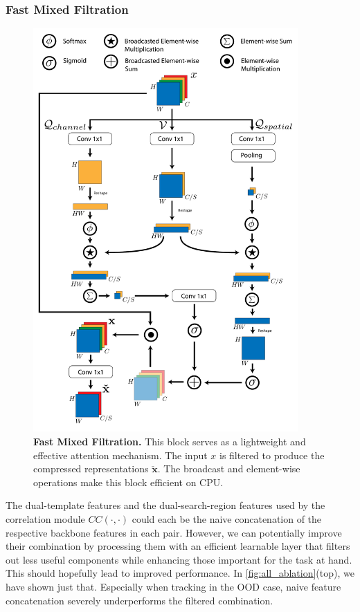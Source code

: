 \subsubsection{Fast Mixed Filtration}
\begin{figure}[t]
  \centering
  \includegraphics[width=0.9\textwidth]{figures/figure7.pdf}
   \caption{\textbf{Fast Mixed Filtration.} This block serves as a lightweight and effective attention mechanism. The input $x$ is filtered to produce the compressed representations $\boldsymbol{\check{x}}$. The broadcast and element-wise operations make this block efficient on CPU. }
   \label{fig:attention2}
\end{figure}
The dual-template features and the dual-search-region features used by the correlation module $CC(\cdot,\cdot)$ could each be the naive concatenation of the respective backbone features in each pair. However, we can potentially improve their combination by processing them with an efficient learnable layer that filters out less useful components while enhancing those important for the task at hand. This should hopefully lead to improved performance. In \ref{fig:all_ablation}(top), we have shown just that. Especially when tracking in the OOD case, naive feature concatenation severely underperforms the filtered combination.\\

